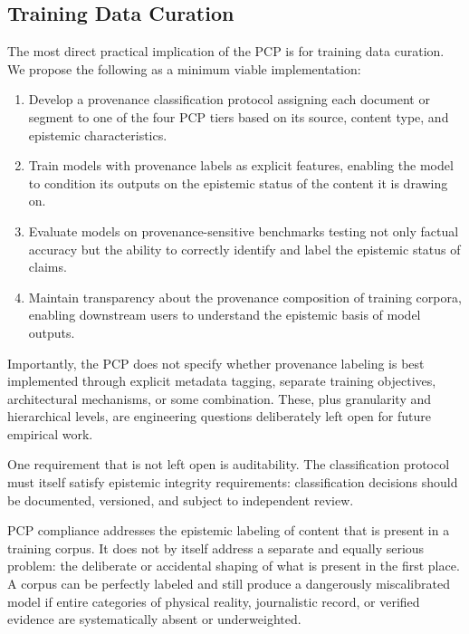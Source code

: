 \documentclass[12pt]{article}
\begin{document}
\subsection{Training Data Curation}\label{training-data-curation}

The most direct practical implication of the PCP is for training data
curation. We propose the following as a minimum viable implementation:

\begin{enumerate}
\def\labelenumi{\arabic{enumi}.}
\item
  Develop a provenance classification protocol assigning each document
  or segment to one of the four PCP tiers based on its source, content
  type, and epistemic characteristics.
\item
  Train models with provenance labels as explicit features, enabling the
  model to condition its outputs on the epistemic status of the content
  it is drawing on.
\item
  Evaluate models on provenance-sensitive benchmarks testing not only
  factual accuracy but the ability to correctly identify and label the
  epistemic status of claims.
\item
  Maintain transparency about the provenance composition of training
  corpora, enabling downstream users to understand the epistemic basis
  of model outputs.
\end{enumerate}

Importantly, the PCP does not specify whether provenance labeling is
best implemented through explicit metadata tagging, separate training
objectives, architectural mechanisms, or some combination. These, plus
granularity and hierarchical levels, are engineering questions
deliberately left open for future empirical work.

One requirement that is not left open is auditability. The
classification protocol must itself satisfy epistemic integrity
requirements: classification decisions should be documented, versioned,
and subject to independent review.

PCP compliance addresses the epistemic labeling of content that is
present in a training corpus. It does not by itself address a separate
and equally serious problem: the deliberate or accidental shaping of
what is present in the first place. A corpus can be perfectly labeled
and still produce a dangerously miscalibrated model if entire categories
of physical reality, journalistic record, or verified evidence are
systematically absent or underweighted.
\end{document}
